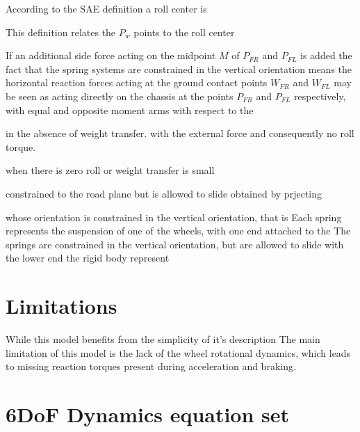 According to the SAE definition a roll center is

\textit{}

This definition relates the $P_w$ points to the roll center

If an additional side force acting on the midpoint $M$ of $P_{FR}$ and $P_{FL}$ is added the fact that the spring systems are constrained in the vertical orientation means the horizontal reaction forces acting at the ground contact points $W_{FR}$ and $W_{FL}$ may be seen as acting directly on the chassis at the points $P_{FR}$ and $P_{FL}$ respectively, with equal and opposite moment arms with respect to the


in the absence of weight transfer.
with the external force and consequently no roll torque.


 when there is zero roll or weight transfer is small


constrained to the road plane but is allowed to slide obtained by prjecting

  whose orientation is constrained in the vertical orientation, that is
Each spring represents the suspension of one of the wheels, with one end attached to the
The springs are constrained in the vertical orientation, but are allowed to slide with the lower end
the rigid body represent
\section{Limitations}
\label{sec:6doflimits}
While this model benefits from the simplicity of it's description
The main limitation of this model is the lack of the wheel rotational dynamics, which leads to missing reaction torques present during acceleration and braking.
\section{6DoF Dynamics equation set}
\label{sec:6dofeq}
